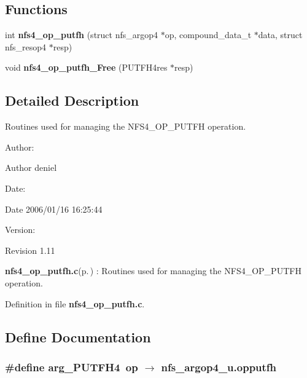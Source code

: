 \subsection*{Functions}
\begin{CompactItemize}
\item 
int {\bf nfs4\_\-op\_\-putfh} (struct nfs\_\-argop4 $\ast$op, compound\_\-data\_\-t $\ast$data, struct nfs\_\-resop4 $\ast$resp)
\item 
void {\bf nfs4\_\-op\_\-putfh\_\-Free} (PUTFH4res $\ast$resp)
\end{CompactItemize}


\subsection{Detailed Description}
Routines used for managing the NFS4\_\-OP\_\-PUTFH operation. 

\begin{Desc}
\item[Author:]\begin{Desc}
\item[Author]deniel \end{Desc}
\end{Desc}
\begin{Desc}
\item[Date:]\begin{Desc}
\item[Date]2006/01/16 16:25:44 \end{Desc}
\end{Desc}
\begin{Desc}
\item[Version:]\begin{Desc}
\item[Revision]1.11 \end{Desc}
\end{Desc}
{\bf nfs4\_\-op\_\-putfh.c}{\rm (p.\,\pageref{nfs4__op__putfh_8c})} : Routines used for managing the NFS4\_\-OP\_\-PUTFH operation.

Definition in file {\bf nfs4\_\-op\_\-putfh.c}.

\subsection{Define Documentation}
\subsubsection{\setlength{\rightskip}{0pt plus 5cm}\#define arg\_\-PUTFH4\ op $\rightarrow$ nfs\_\-argop4\_\-u.opputfh}\label{nfs4__op__putfh_8c_a0}




